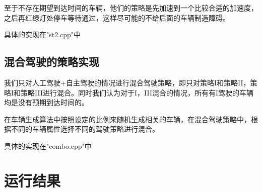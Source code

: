 \documentclass[UTF8,a4paper]{ctexart}
\begin{document}
至于不存在期望到达时间的车辆，他们的策略是先加速到一个比较合适的加速度，之后再红绿灯处停车等待通过，这样尽可能的不给后面的车辆制造障碍。

具体的实现在"st2.cpp"中
\subsection{混合驾驶的策略实现}
我们只对人工驾驶+自主驾驶的情况进行混合驾驶策略，即只对策略I和策略II，策略I和策略III进行混合。同时我们认为对于I，III混合的情况，所有有I驾驶的车辆均是没有预期到达时间的。

在车辆生成算法中按照设定的比例来随机生成相关的车辆，在混合驾驶策略中，根据不同的车辆属性选择不同的驾驶策略进行混合。

具体的实现在"combo.cpp"中
\section{运行结果}
\end{document}
